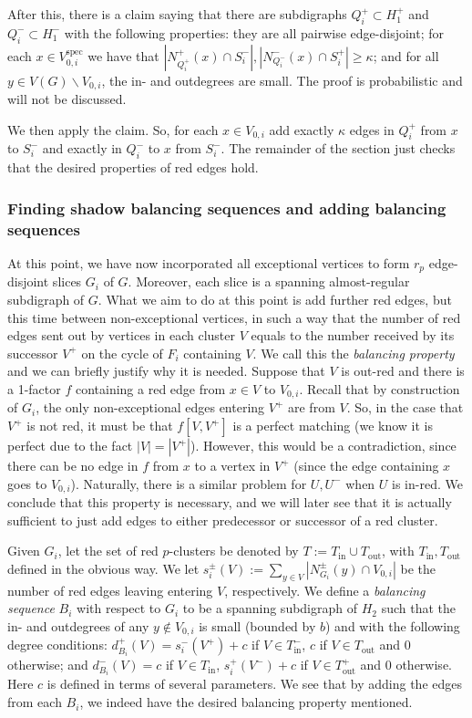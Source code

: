 \documentclass[10pt,letterpaper, reqno]{amsart}
\theoremstyle{definition}
\numberwithin{equation}{section}
\begin{document}
After this, there is a claim saying that there are subdigraphs $Q_i^+ \subset H_1^+$ and $Q_i^- \subset H_1^-$ with the following properties: they are all pairwise edge-disjoint; for each $x \in V_{0,i}^\text{spec}$ we have that $|N^+_{Q_i^+}(x) \cap S^-_i|, |N^-_{Q_i^-}(x) \cap S^+_i| \geq \kappa$; and for all $y \in V(G)\backslash V_{0,i}$, the in- and outdegrees are small. The proof is probabilistic and will not be discussed.

We then apply the claim. So, for each $x \in V_{0,i}$ add exactly $\kappa$ edges in $Q_i^+$ from $x$ to $S_i^-$ and exactly in $Q_i^-$ to $x$ from $S_i^-$. The remainder of the section just checks that the desired properties of red edges hold. 

\subsubsection{Finding shadow balancing sequences and adding balancing sequences} At this point, we have now incorporated all exceptional vertices to form $r_p$ edge-disjoint slices $G_i$ of $G$. Moreover, each slice is a spanning almost-regular subdigraph of $G$. What we aim to do at this point is add further red edges, but this time between non-exceptional vertices, in such a way that the number of red edges sent out by vertices in each cluster $V$ equals to the number received by its successor $V^+$ on the cycle of $F_i$ containing $V$. We call this the \textit{balancing property} and we can briefly justify why it is needed. Suppose that $V$ is out-red and there is a 1-factor $f$ containing a red edge from $x \in V$ to $V_{0,i}$. Recall that by construction of $G_i$, the only non-exceptional edges entering $V^+$ are from $V$. So, in the case that $V^+$ is not red, it must be that $f[V,V^+]$ is a perfect matching (we know it is perfect due to the fact $|V|=|V^+|$). However, this would be a contradiction, since there can be no edge in $f$ from $x$ to a vertex in $V^+$ (since the edge containing $x$ goes to $V_{0,i}$). Naturally, there is a similar problem for $U, U^-$ when $U$ is in-red. We conclude that this property is necessary, and we will later see that it is actually sufficient to just add edges to either predecessor or successor of a red cluster.

Given $G_i$, let the set of red $p$-clusters be denoted by $T := T_{\text{in}} \cup T_{\text{out}}$, with $T_\text{in}, T_\text{out}$ defined in the obvious way. We let $s_i^\pm(V) := \sum_{y \in V}|N^\pm_{G_i}(y) \cap V_{0,i}|$ be the number of red edges leaving entering $V$, respectively. We define a \textit{balancing sequence} $B_i$ with respect to $G_i$ to be a spanning subdigraph of $H_2$ such that the in- and outdegrees of any $y \not \in V_{0,i}$ is small (bounded by $b$) and with the following degree conditions: $d^+_{B_i}(V) = s^-_i(V^+)+c$ if $V\in T^-_\text{in}$, $c$ if $V \in T_\text{out}$ and 0 otherwise; and $d^-_{B_i}(V) = c$ if $V \in T_\text{in}$, $s_i^+(V^-) + c$ if $V \in T^+_\text{out}$ and 0 otherwise. Here $c$ is defined in terms of several parameters. We see that by adding the edges from each $B_i$, we indeed have the desired balancing property mentioned. 
\end{document}
